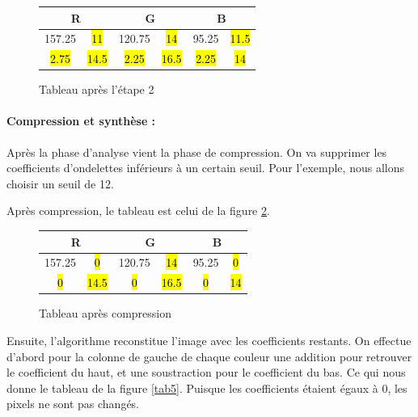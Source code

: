 \documentclass{article}
\begin{document}
\begin{figure}[!h]
\begin{center}
\begin{tabular}{|c|c|c|c|c|c|}
\hline
\multicolumn{2}{|c|}{R} & \multicolumn{2}{|c|}{G}  & \multicolumn{2}{|c|}{B} \\
\hline
157.25    & \hl{11}   &   120.75  & \hl{14} &   95.25  & \hl{11.5}   \\ 
\hline
\hl{2.75}    & \hl{14.5}   &   \hl{2.25}  & \hl{16.5} &   \hl{2.25}  & \hl{14} \\
\hline
\end{tabular}
\end{center}
\caption{Tableau après l'étape 2}
\label{tab3}
\end{figure}



\paragraph{Compression et synthèse :}

Après la phase d'analyse vient la phase de compression. On va supprimer les coefficients d'ondelettes inférieurs à un certain seuil. Pour l'exemple, nous allons choisir un seuil de 12.

Après compression, le tableau est celui de la figure \ref{tab4}.

\begin{figure}[!h]
\begin{center}
\begin{tabular}{|c|c|c|c|c|c|}
\hline
\multicolumn{2}{|c|}{R} & \multicolumn{2}{|c|}{G}  & \multicolumn{2}{|c|}{B} \\
\hline
157.25    & \hl{0}   &   120.75  & \hl{14} &   95.25  & \hl{0}   \\ 
\hline
\hl{0}    & \hl{14.5}   &   \hl{0}  & \hl{16.5} &   \hl{0}  & \hl{14} \\
\hline
\end{tabular}
\end{center}
\caption{Tableau après compression}
\label{tab4}
\end{figure}

Ensuite, l'algorithme reconstitue l'image avec les coefficients restants. On effectue d'abord pour la colonne de gauche de chaque couleur une addition pour retrouver le coefficient du haut, et une soustraction pour le coefficient du bas. Ce qui nous donne le tableau de la figure \ref{tab5}. Puisque les coefficients étaient égaux à 0, les pixels ne sont pas changés.
\end{document}
